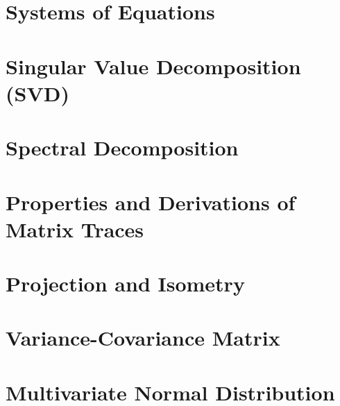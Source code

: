 \documentclass{article}
\theoremstyle{definition}
\theoremstyle{remark}
\begin{document}
\section{Systems of Equations}

\section{Singular Value Decomposition (SVD)}

\section{Spectral Decomposition}

\section{Properties and Derivations of Matrix Traces}

\section{Projection and Isometry}

\section{Variance-Covariance Matrix}

\section{Multivariate Normal Distribution}
\end{document}
